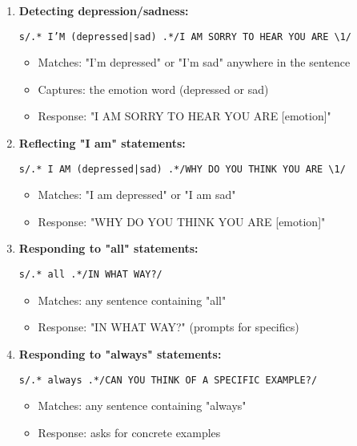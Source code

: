 \documentclass[11pt,a4paper]{article}
\theoremstyle{definition}
\theoremstyle{plain}
\theoremstyle{remark}
\begin{document}
\begin{enumerate}
    \item \textbf{Detecting depression/sadness:}
    
    \texttt{s/.* I'M (depressed|sad) .*/I AM SORRY TO HEAR YOU ARE \textbackslash 1/}
    
    \begin{itemize}
        \item Matches: "I'm depressed" or "I'm sad" anywhere in the sentence
        \item Captures: the emotion word (depressed or sad)
        \item Response: "I AM SORRY TO HEAR YOU ARE [emotion]"
    \end{itemize}
    
    \item \textbf{Reflecting "I am" statements:}
    
    \texttt{s/.* I AM (depressed|sad) .*/WHY DO YOU THINK YOU ARE \textbackslash 1/}
    
    \begin{itemize}
        \item Matches: "I am depressed" or "I am sad"
        \item Response: "WHY DO YOU THINK YOU ARE [emotion]"
    \end{itemize}
    
    \item \textbf{Responding to "all" statements:}
    
    \texttt{s/.* all .*/IN WHAT WAY?/}
    
    \begin{itemize}
        \item Matches: any sentence containing "all"
        \item Response: "IN WHAT WAY?" (prompts for specifics)
    \end{itemize}
    
    \item \textbf{Responding to "always" statements:}
    
    \texttt{s/.* always .*/CAN YOU THINK OF A SPECIFIC EXAMPLE?/}
    
    \begin{itemize}
        \item Matches: any sentence containing "always"
        \item Response: asks for concrete examples
    \end{itemize}
\end{enumerate}
\end{document}
